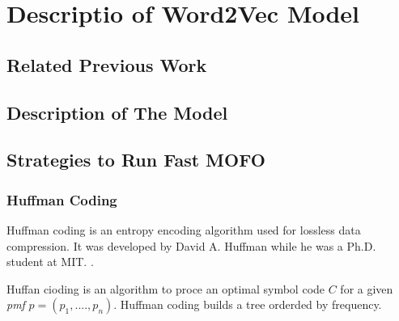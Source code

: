 \chapter{Descriptio of Word2Vec Model }
\label{chap:related_work}


\section{Related Previous Work}
\label{sec:strategies_improve_time}


\section{Description of The Model}
\label{sec:huffman_coding}


\section{Strategies to Run Fast MOFO }
\label{sec:strategies_improve_time}

\subsection{Huffman Coding}
\label{sec:huffman_coding}

Huffman coding is an entropy  encoding algorithm used for lossless data
compression.  It was developed by David A. Huffman while he was a Ph.D.
student at MIT. \cite{huf52}.

Huffan cioding is an algorithm to proce an  optimal symbol code $C$ for a given 
\emph{pmf} $ p = (p_1,....,p_n) $.  Huffman coding builds a tree orderded by frequency.





